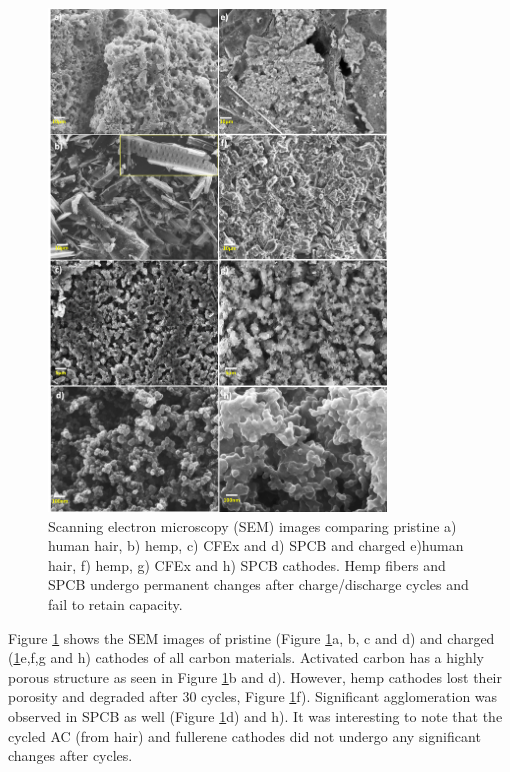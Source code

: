 \documentclass{article}
\begin{document}
\begin{figure}[h!]
  \centering
  \includegraphics[width=0.8\textwidth]{fig/SEM}
    \caption{Scanning electron microscopy (SEM) images comparing pristine a) human hair, b) hemp, c) CFEx and d) SPCB and charged e)human hair, f) hemp, g) CFEx and h) SPCB cathodes. Hemp fibers and SPCB undergo permanent changes after charge/discharge cycles and fail to retain capacity.}
  \label{fig:SEM}
\end{figure}

Figure \ref{fig:SEM} shows the SEM images of pristine (Figure \ref{fig:SEM}a, b, c and d) and charged (\ref{fig:SEM}e,f,g and h) cathodes of all carbon materials. Activated carbon has a highly porous structure as seen in Figure \ref{fig:SEM}b and d). However, hemp cathodes lost their porosity and degraded after 30 cycles, Figure \ref{fig:SEM}f). Significant agglomeration was observed in SPCB as well (Figure \ref{fig:SEM}d) and h). It was interesting to note that the cycled AC (from hair) and fullerene cathodes did not undergo any significant changes after cycles. 
\end{document}
